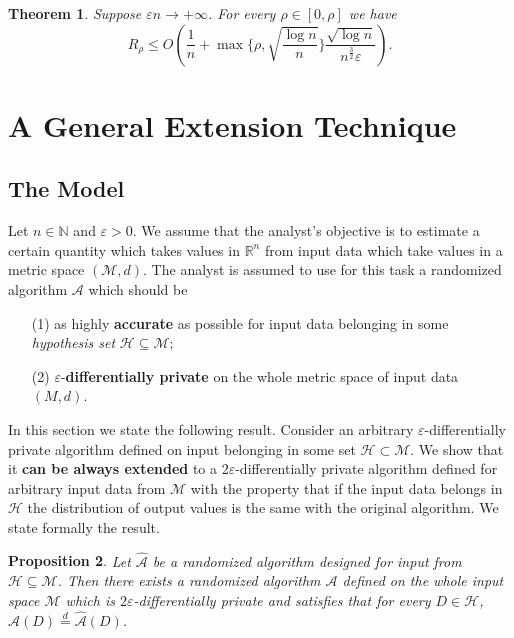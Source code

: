 \documentclass[12pt,a4paper]{article}
\newtheorem{theorem}{Theorem}[section]
\numberwithin{equation}{section}
\newtheorem{proposition}[theorem]{Proposition}
\numberwithin{equation}{section}
\renewcommand{\epsilon}{\varepsilon}
\newcommand{\1}{{\text{\Large $\mathfrak 1$}}}
\newcommand{\2}[1]{{\text{\Large $\mathfrak 1$}\!\left(#1\right)}}
\begin{document}
\begin{theorem}\label{thm32}
Suppose $\epsilon n \rightarrow +\infty$. For every $\rho \in
[0,\rho]$ we have $$R_{\rho} \leq O \left(
  \frac{1}{n}+\max\{\rho,\sqrt{\frac{\log n}{n}}\} \frac{\sqrt{\log n}}{n^{\frac{3}{2}} \epsilon} \right).$$
\end{theorem}


%
%





\section{A General Extension Technique}
\subsection*{The Model}
Let $n \in \mathbb{N}$ and $\epsilon>0$. We assume that the analyst's objective is to estimate a certain quantity which takes values in $ \mathbb{R}^n$ from input data which take values in a metric space $(\mathcal{M},d)$. The analyst is assumed to use for this task a randomized algorithm $\mathcal{A}$ which should be \begin{itemize}
\item[(1)] as highly \textbf{accurate} as possible for input data belonging in some \textit{hypothesis set} $\mathcal{H} \subseteq \mathcal{M}$;

\item[(2)] $\epsilon$-\textbf{differentially private} on the whole metric space of input data $(M,d)$.
\end{itemize}

In this section we state the following result. Consider an arbitrary $\epsilon$-differentially private algorithm defined on input belonging in some set $\mathcal{H} \subset \mathcal{M}.$ We show that it \textbf{can be always extended} to a $2\epsilon$-differentially private algorithm defined for arbitrary input data from $\mathcal{M}$ with the property that if the input data belongs in $\mathcal{H}$ the distribution of output values is the same with the original algorithm. We state formally the result. 

\begin{proposition}\label{extension}
Let $\hat{\mathcal{A}}$ be a randomized algorithm designed for input from $\mathcal{H} \subseteq \mathcal{M}$. Then there exists a randomized algorithm $\mathcal{A}$ defined on the whole input space $\mathcal{M}$ which is $2\epsilon$-differentially private and satisfies that for every $D \in \mathcal{H}$, $\mathcal{A}(D) \overset{d}{=}  \hat{\mathcal{A}}(D)$.
\end{proposition}
\end{document}
